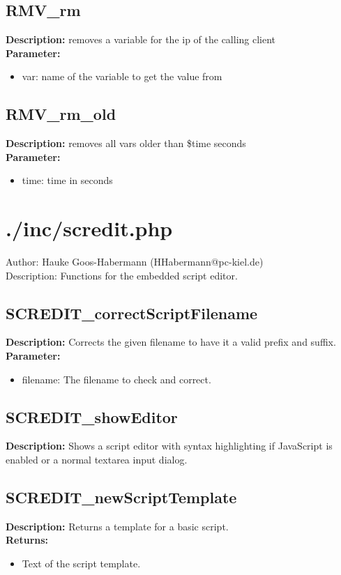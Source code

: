 \subsection{RMV\_rm}
\textbf{Description:} removes a variable for the ip of the calling client\\
\textbf{Parameter:}
\begin{itemize}
\item var: name of the variable to get the value from
\end{itemize}

\subsection{RMV\_rm\_old}
\textbf{Description:} removes all vars older than \$time seconds\\
\textbf{Parameter:}
\begin{itemize}
\item time: time in seconds
\end{itemize}

\newpage\section{./inc/scredit.php}
 Author: Hauke Goos-Habermann (HHabermann@pc-kiel.de)\\
 Description: Functions for the embedded script editor.\\

\subsection{SCREDIT\_correctScriptFilename}
\textbf{Description:} Corrects the given filename to have it a valid prefix and suffix.\\
\textbf{Parameter:}
\begin{itemize}
\item filename: The filename to check and correct.
\end{itemize}

\subsection{SCREDIT\_showEditor}
\textbf{Description:} Shows a script editor with syntax highlighting if JavaScript is enabled or a normal textarea input dialog.\\

\subsection{SCREDIT\_newScriptTemplate}
\textbf{Description:} Returns a template for a basic script.\\
\textbf{Returns:}
\begin{itemize}
\item Text of the script template.
\end{itemize}

